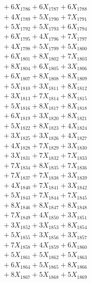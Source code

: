 \documentclass[a4paper,10pt]{article}
\begin{document}
{\begin{align}
&\;  + 6 X_{1786} + 6 X_{1787} + 6 X_{1788} \\[0.3ex]
&\;  + 4 X_{1789} + 5 X_{1790} + 7 X_{1791} \\[0.3ex]
&\;  + 5 X_{1792} + 5 X_{1793} + 6 X_{1794} \\[0.3ex]
&\;  + 6 X_{1795} + 4 X_{1796} + 7 X_{1797} \\[0.3ex]
&\;  + 4 X_{1798} + 5 X_{1799} + 5 X_{1800} \\[0.3ex]
&\;  + 6 X_{1801} + 8 X_{1802} + 7 X_{1803} \\[0.3ex]
&\;  + 8 X_{1804} + 6 X_{1805} + 3 X_{1806} \\[0.3ex]
&\;  + 6 X_{1807} + 8 X_{1808} + 8 X_{1809} \\[0.5ex]\allowbreak
&\;  + 5 X_{1810} + 3 X_{1811} + 8 X_{1812} \\[0.3ex]
&\;  + 3 X_{1813} + 7 X_{1814} + 8 X_{1815} \\[0.3ex]
&\;  + 5 X_{1816} + 8 X_{1817} + 8 X_{1818} \\[0.3ex]
&\;  + 6 X_{1819} + 3 X_{1820} + 8 X_{1821} \\[0.3ex]
&\;  + 5 X_{1822} + 8 X_{1823} + 4 X_{1824} \\[0.3ex]
&\;  + 3 X_{1825} + 3 X_{1826} + 4 X_{1827} \\[0.3ex]
&\;  + 4 X_{1828} + 7 X_{1829} + 3 X_{1830} \\[0.3ex]
&\;  + 3 X_{1831} + 7 X_{1832} + 7 X_{1833} \\[0.3ex]
&\;  + 7 X_{1834} + 8 X_{1835} + 7 X_{1836} \\[0.3ex]
&\;  + 7 X_{1837} + 7 X_{1838} + 3 X_{1839} \\[0.5ex]\allowbreak
&\;  + 4 X_{1840} + 7 X_{1841} + 3 X_{1842} \\[0.3ex]
&\;  + 5 X_{1843} + 7 X_{1844} + 7 X_{1845} \\[0.3ex]
&\;  + 8 X_{1846} + 8 X_{1847} + 8 X_{1848} \\[0.3ex]
&\;  + 7 X_{1849} + 4 X_{1850} + 3 X_{1851} \\[0.3ex]
&\;  + 3 X_{1852} + 3 X_{1853} + 8 X_{1854} \\[0.3ex]
&\;  + 5 X_{1855} + 3 X_{1856} + 3 X_{1857} \\[0.3ex]
&\;  + 7 X_{1858} + 4 X_{1859} + 6 X_{1860} \\[0.3ex]
&\;  + 5 X_{1861} + 5 X_{1862} + 5 X_{1863} \\[0.3ex]
&\;  + 6 X_{1864} + 5 X_{1865} + 8 X_{1866} \\[0.3ex]
&\;  + 8 X_{1867} + 5 X_{1868} + 5 X_{1869} \\[0.5ex]\allowbreak

\end{align}}
\end{document}
